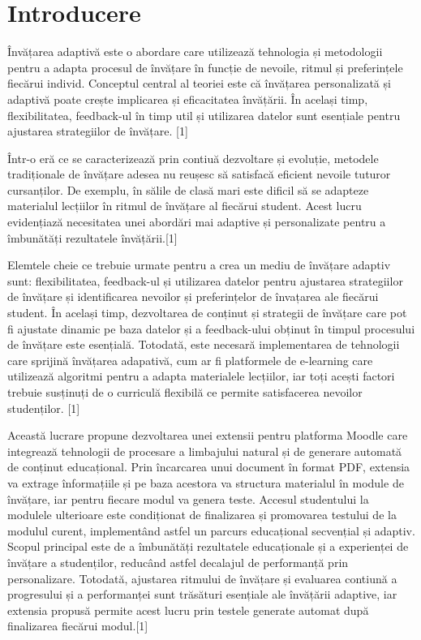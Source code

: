 \chapter*{Introducere} 

Învățarea adaptivă este o abordare care utilizează tehnologia și metodologii pentru a adapta procesul de învățare în funcție de nevoile, ritmul și preferințele fiecărui individ. Conceptul 
central al teoriei este că învățarea personalizată și adaptivă poate crește implicarea și eficacitatea învățării. În același timp, flexibilitatea, feedback-ul în timp util și utilizarea 
datelor sunt esențiale pentru ajustarea strategiilor de învățare. [1]

Într-o eră ce se caracterizează prin contiuă dezvoltare și evoluție, metodele tradi\-țio\-na\-le de învățare adesea nu reușesc să satisfacă eficient nevoile tuturor cursanților. De exemplu, în 
sălile de clasă mari este dificil să se adapteze materialul lecțiilor în ritmul de învățare al fiecărui student. Acest lucru evidențiază necesitatea unei abordări mai adaptive și personalizate 
pentru a îmbunătăți rezultatele învățării.[1]

Elemtele cheie ce trebuie urmate pentru a crea un mediu de învățare adaptiv sunt: flexibilitatea, feedback-ul și utilizarea datelor pentru ajustarea strategiilor de învățare și 
identificarea nevoilor și preferințelor de învațarea ale fiecărui student. În același timp, dezvoltarea de conținut și strategii de învățare care pot fi ajustate dinamic pe baza datelor și 
a feedback-ului obținut în timpul procesului de învățare este esențială. Totodată, este necesară implementarea de tehnologii care sprijină învățarea adapativă, cum ar fi platformele de
e-learning care utilizează algoritmi pentru a adapta materialele lecțiilor, iar toți acești factori trebuie susținuți de o curriculă flexibilă ce permite satisfacerea nevoilor 
studenților. [1] 

Această lucrare propune dezvoltarea unei extensii pentru platforma Moodle care integrează tehnologii de procesare a limbajului natural și de generare automată de conținut educațional. 
Prin încarcarea unui document în format PDF, extensia va extrage înformațiile și pe baza acestora va structura materialul în module de învățare, iar pentru fiecare modul va genera teste. 
Accesul studentului la modulele ulterioare este condiționat de finalizarea și promovarea testului de la modulul curent, implementând astfel un parcurs educațional secvențial și adaptiv. 
Scopul principal este de a îmbunătăți rezultatele educaționale și a experienței de învățare a studenților, reducând astfel decalajul de performanță prin personalizare. Totodată, ajustarea 
ritmului de învățare și evaluarea contiună a progresului și a performanței sunt trăsături esențiale ale învățării adaptive, iar extensia propusă permite acest lucru prin testele generate
automat după finalizarea fiecărui modul.[1] 